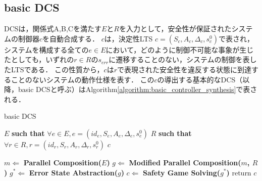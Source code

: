 \subsection{basic DCS}
\label{subsection:DCS algorithm}
DCSは，関係式A,B,Cを満たす$E$と$R$を入力として，安全性が保証されたシステムの制御器$c$を自動合成する．
$c$は，決定性LTS $c = (S_{c}, A_{c}, \Delta_{c}, s^0_{c})$で表され，
システムを構成する全ての$e \in E$において，どのように制御不可能な事象が生じたとしても，いずれの$r \in R$の$s_{err}$に遷移することのない，システムの制御を表したLTSである．
この性質から，$c$は$r$で表現された安全性を違反する状態に到達することのないシステムの動作仕様を表す．
この$c$の導出する基本的なDCS（以降，basic DCSと呼ぶ）\cite{paper:SynthesisOfLiveBehaviourModels}\cite{paper:SynthesisOfRun-To-CompletionControllers}\cite{paper:Concurrency}はAlgorithm\ref{algorithm:basic_controller_synthesis}で表される．

\begin{algorithm}[h]
\caption{basic DCS}
\label{algorithm:basic_controller_synthesis}
\begin{algorithmic}[1]
\renewcommand{\algorithmicrequire}{\textbf{Input:}}
\renewcommand{\algorithmicensure}{\textbf{Output:}}
\REQUIRE $E$ {\bf such that} $\forall e \in E, e = (id_{e}, S_{e}, A_{e}, \Delta_{e}, s^0_{e})$
\REQUIRE $R$ {\bf such that} $\forall r \in R, r = (id_{r}, S_{r}, A_{r}, \Delta_{r}, s^0_{r})$
\ENSURE  $c$

\STATE $m   \Leftarrow$ {\bf Parallel Composition($E$)}
\STATE $g   \Leftarrow$ {\bf Modified Parallel Composition($m$, $R$)}
\STATE $g^* \Leftarrow$ {\bf Error State Abstraction($g$)}
\STATE $c   \Leftarrow$ {\bf Safety Game Solving($g^*$)}
\STATE return $c$
\end{algorithmic}
\end{algorithm}

